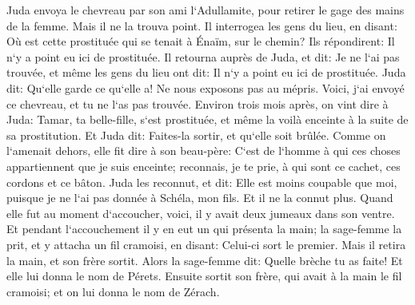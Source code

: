 \verse Juda envoya le chevreau par son ami l`Adullamite, pour retirer le gage des mains de la femme. Mais il ne la trouva point. 
\verse Il interrogea les gens du lieu, en disant: Où est cette prostituée qui se tenait à Énaïm, sur le chemin? Ils répondirent: Il n`y a point eu ici de prostituée. 
\verse Il retourna auprès de Juda, et dit: Je ne l`ai pas trouvée, et même les gens du lieu ont dit: Il n`y a point eu ici de prostituée. 
\verse Juda dit: Qu`elle garde ce qu`elle a! Ne nous exposons pas au mépris. Voici, j`ai envoyé ce chevreau, et tu ne l`as pas trouvée. 
\verse Environ trois mois après, on vint dire à Juda: Tamar, ta belle-fille, s`est prostituée, et même la voilà enceinte à la suite de sa prostitution. Et Juda dit: Faites-la sortir, et qu`elle soit brûlée. 
\verse Comme on l`amenait dehors, elle fit dire à son beau-père: C`est de l`homme à qui ces choses appartiennent que je suis enceinte; reconnais, je te prie, à qui sont ce cachet, ces cordons et ce bâton. 
\verse Juda les reconnut, et dit: Elle est moins coupable que moi, puisque je ne l`ai pas donnée à Schéla, mon fils. Et il ne la connut plus. 
\verse Quand elle fut au moment d`accoucher, voici, il y avait deux jumeaux dans son ventre. 
\verse Et pendant l`accouchement il y en eut un qui présenta la main; la sage-femme la prit, et y attacha un fil cramoisi, en disant: Celui-ci sort le premier. 
\verse Mais il retira la main, et son frère sortit. Alors la sage-femme dit: Quelle brèche tu as faite! Et elle lui donna le nom de Pérets. 
\verse Ensuite sortit son frère, qui avait à la main le fil cramoisi; et on lui donna le nom de Zérach. 

